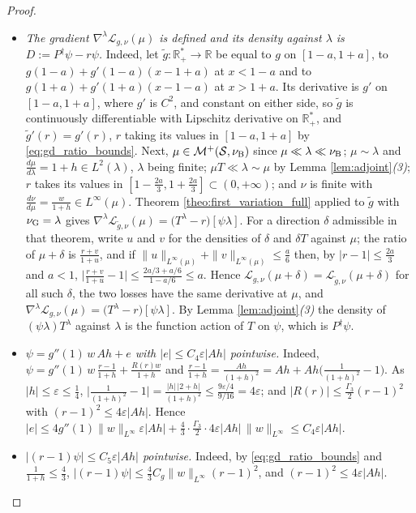 \begin{proof}
\begin{itemize}
    \item \emph{The gradient $\nabla^\lambda\mathcal L_{g,\nu}(\mu)$ is defined and its density against $\lambda$ is $D:=P^\dagger\psi-r\psi$.} Indeed, let $\widetilde g:\mathbb R_+^*\rightarrow\mathbb R$ be equal to $g$ on $[1-a,1+a]$, to $g(1-a)+g'(1-a)(x-1+a)$ at $x<1-a$ and to $g(1+a)+g'(1+a)(x-1-a)$ at $x>1+a$. Its derivative is $g'$ on $[1-a,1+a]$, where $g'$ is $C^2$, and constant on either side, so $\widetilde g$ is continuously differentiable with Lipschitz derivative on $\mathbb R_+^*$, and $\widetilde g'(r)=g'(r)$, $r$ taking its values in $[1-a,1+a]$ by \eqref{eq:gd_ratio_bounds}. Next, $\mu\in\mathcal M^+(\mathcal S,\nu_{\mathrm{B}})$ since $\mu\ll\lambda\ll\nu_{\mathrm{B}}$; $\mu\sim\lambda$ and $\frac{d\mu}{d\lambda}=1+h\in L^2(\lambda)$, $\lambda$ being finite; $\mu T\ll\lambda\sim\mu$ by Lemma \ref{lem:adjoint}\emph{(3)}; $r$ takes its values in $[1-\frac{2a}3,1+\frac{2a}3]\subset(0,+\infty)$; and $\nu$ is finite with $\frac{d\nu}{d\mu}=\frac w{1+h}\in L^\infty(\mu)$. Theorem \ref{theo:first_variation_full} applied to $\widetilde g$ with $\nu_{\mathrm{G}}=\lambda$ gives $\nabla^\lambda\mathcal L_{\widetilde g,\nu}(\mu)=\bigl(T^\lambda-r\bigr)[\psi\lambda]$. For a direction $\delta$ admissible in that theorem, write $u$ and $v$ for the densities of $\delta$ and $\delta T$ against $\mu$; the ratio of $\mu+\delta$ is $\frac{r+v}{1+u}$, and if $\|u\|_{L^\infty(\mu)}+\|v\|_{L^\infty(\mu)}\leq\frac a6$ then, by $|r-1|\leq\frac{2a}3$ and $a<1$, $\bigl|\frac{r+v}{1+u}-1\bigr|\leq\frac{2a/3+a/6}{1-a/6}\leq a$. Hence $\mathcal L_{g,\nu}(\mu+\delta)=\mathcal L_{\widetilde g,\nu}(\mu+\delta)$ for all such $\delta$, the two losses have the same derivative at $\mu$, and $\nabla^\lambda\mathcal L_{g,\nu}(\mu)=\bigl(T^\lambda-r\bigr)[\psi\lambda]$. By Lemma \ref{lem:adjoint}\emph{(3)} the density of $(\psi\lambda)T^\lambda$ against $\lambda$ is the function action of $T$ on $\psi$, which is $P^\dagger\psi$.
    \item \emph{$\psi=g''(1)\,w\,Ah+e$ with $|e|\leq C_4\varepsilon|Ah|$ pointwise.} Indeed, $\psi=g''(1)\,w\,\frac{r-1}{1+h}+\frac{R(r)w}{1+h}$ and $\frac{r-1}{1+h}=\frac{Ah}{(1+h)^2}=Ah+Ah\bigl(\frac1{(1+h)^2}-1\bigr)$. As $|h|\leq\varepsilon\leq\frac14$, $\bigl|\frac1{(1+h)^2}-1\bigr|=\frac{|h|\,|2+h|}{(1+h)^2}\leq\frac{9\varepsilon/4}{9/16}=4\varepsilon$; and $|R(r)|\leq\frac{\Gamma_3}2(r-1)^2$ with $(r-1)^2\leq4\varepsilon|Ah|$. Hence $|e|\leq4g''(1)\|w\|_{L^\infty}\varepsilon|Ah|+\frac43\cdot\frac{\Gamma_3}2\cdot4\varepsilon|Ah|\,\|w\|_{L^\infty}\leq C_4\varepsilon|Ah|$.
    \item \emph{$|(r-1)\psi|\leq C_5\varepsilon|Ah|$ pointwise.} Indeed, by \eqref{eq:gd_ratio_bounds} and $\frac1{1+h}\leq\frac43$, $|(r-1)\psi|\leq\frac43C_g\|w\|_{L^\infty}(r-1)^2$, and $(r-1)^2\leq4\varepsilon|Ah|$.

\end{itemize}
\end{proof}
